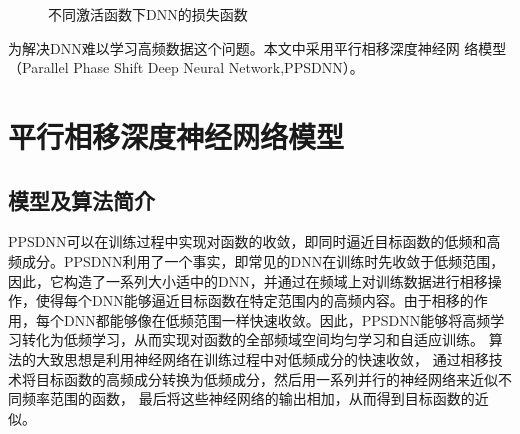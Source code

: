 \begin{figure}[htbp!]
    \centering
    \hspace{0.5in} %
    \caption{不同激活函数下DNN的损失函数}
    \label{fig:u235fploss}
  \end{figure}


为解决DNN难以学习高频数据这个问题。本文中采用平行相移深度神经网
络模型\cite{cai2019phasednn}（Parallel Phase Shift Deep Neural Network,PPSDNN）。

\section{平行相移深度神经网络模型}

\subsection{模型及算法简介}
PPSDNN可以在训练过程中实现对函数的收敛，即同时逼近目标函数的低频和高频成分。PPSDNN利用了一个事实，即常见的DNN在训练时先收敛于低频范围，因此，它构造了一系列大小适中的DNN，并通过在频域上对训练数据进行相移操作，使得每个DNN能够逼近目标函数在特定范围内的高频内容。由于相移的作用，每个DNN都能够像在低频范围一样快速收敛。因此，PPSDNN能够将高频学习转化为低频学习，从而实现对函数的全部频域空间均匀学习和自适应训练。\cite{daubechies1992ten}
算法的大致思想是利用神经网络在训练过程中对低频成分的快速收敛，
通过相移技术将目标函数的高频成分转换为低频成分，然后用一系列并行的神经网络来近似不同频率范围的函数，
最后将这些神经网络的输出相加，从而得到目标函数的近似。

